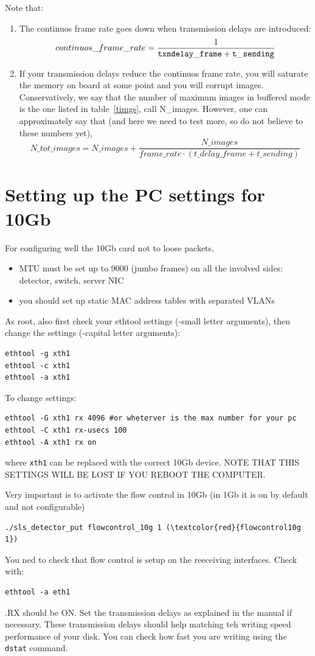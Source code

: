 \documentclass{article}
\begin{document}
{{{Note that:
\begin{enumerate}
\item The continuos frame rate goes down when transmission delays are introduced:
\begin{equation}
continuos\_frame\_rate= \frac{1}{\tt{txndelay\_frame}+t\_sending}
\end{equation}
\item If your transmission delays reduce the continuos frame rate, you will saturate the memory on board at some point and you will corrupt images.  Conservatively, we say that the number of maximum images in buffered mode is the one listed in table~\ref{timgs}, call N\_images. However, one can approximately say that (and here we need to test more, so do not believe to these numbers yet), 
\begin{equation}
N\_tot\_images= N\_images+\frac{ N\_images}{frame\_rate \cdot (t\_delay\_frame + t\_sending) } 
\end{equation}

\end{enumerate}


\section{Setting up the PC settings for 10Gb}\label{10g}

For configuring well the 10Gb card not to loose packets, 
\begin{itemize}
\item MTU must be set up to 9000 (jumbo frames) on all the involved sides: detector, switch, server NIC
\item you should set up static MAC address tables with separated VLANs
\end{itemize}
As root, also first check your ethtool settings (-small letter arguments), then change the settings (-capital letter arguments):
\begin{verbatim}
ethtool -g xth1 
ethtool -c xth1 
ethtool -a xth1
\end{verbatim}

To change settings:
\begin{verbatim}
ethtool -G xth1 rx 4096 #or wheterver is the max number for your pc
ethtool -C xth1 rx-usecs 100 
ethtool -A xth1 rx on
\end{verbatim}
where {\tt{xth1}} can be replaced with the correct 10Gb device.
NOTE THAT THIS SETTINGS WILL BE LOST IF YOU REBOOT THE COMPUTER.

Very important is to activate the flow control in 10Gb (in 1Gb it is on by default and not configurable)
\begin{verbatim}
./sls_detector_put flowcontrol_10g 1 (\textcolor{red}{flowcontrol10g 1})
\end{verbatim}
You ned to check that flow control is setup on the reeceiving interfaces. Check with:
\begin{verbatim}
ethtool -a eth1
\end{verbatim}
.RX should be ON. Set the transmission delays as explained in the manual if necessary. These transmission delays should help matching teh writing speed performance of your disk. You can check how fast you are writing using the {\tt{dstat}} command.  

}}}
\end{document}

